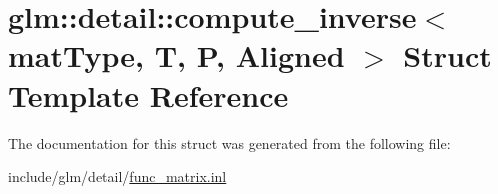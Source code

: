 \hypertarget{structglm_1_1detail_1_1compute__inverse}{}\section{glm\+:\+:detail\+:\+:compute\+\_\+inverse$<$ mat\+Type, T, P, Aligned $>$ Struct Template Reference}
\label{structglm_1_1detail_1_1compute__inverse}


The documentation for this struct was generated from the following file\+:\begin{DoxyCompactItemize}
\item 
include/glm/detail/\hyperlink{func__matrix_8inl}{func\+\_\+matrix.\+inl}\end{DoxyCompactItemize}
